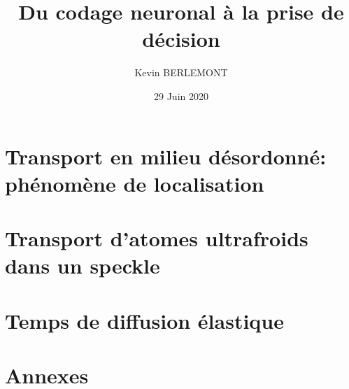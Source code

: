 \documentclass[a4paper, 11pt,twoside,openright]{book}
\title{Du codage neuronal \`a la prise de d\'ecision}
\author{Kevin BERLEMONT}
\institute{l'Ecole Normale Sup\'erieure}
\date{29 Juin 2020}
\begin{document}
{\hypersetup{linkcolor=black}
\tableofcontents}


\part{Transport en milieu désordonné: phénomène de localisation}

\stopcontents

\part{Transport d'atomes ultrafroids dans un speckle} 



\stopcontents

\part{Temps de diffusion élastique}


\stopcontents




\part{Annexes}
\appendix


\stopcontents

 
 
\end{document}
